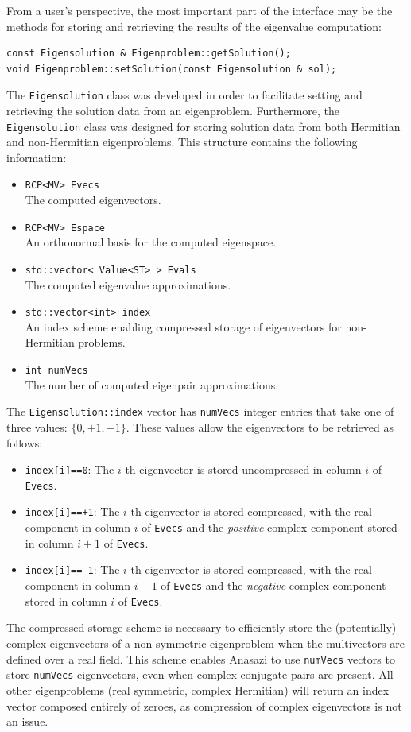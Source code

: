 \documentclass[acmtoms]{acmtrans2m}
\newcommand{\aspace}[1]{\texttt{#1}}
\begin{document}
From a user's perspective, the most important part of the interface may be the methods 
for storing and retrieving the results of the eigenvalue computation:
\begin{verbatim}
const Eigensolution & Eigenproblem::getSolution();
void Eigenproblem::setSolution(const Eigensolution & sol);
\end{verbatim}
The \aspace{Eigensolution} class was developed in order to
facilitate setting and retrieving the solution data from an eigenproblem.  
Furthermore, the \aspace{Eigensolution} class was designed for storing
solution data from both Hermitian and non-Hermitian eigenproblems. 
This structure contains the following information:
\begin{itemize}
  \item \verb!RCP<MV> Evecs! \\
   The computed eigenvectors.
 \item \verb!RCP<MV> Espace! \\
   An orthonormal basis for the computed eigenspace.
 \item \verb!std::vector< Value<ST> > Evals! \\
   The computed eigenvalue approximations.
 \item \verb!std::vector<int> index! \\
   An index scheme enabling compressed storage of eigenvectors for non-Hermitian problems.
 \item \verb!int numVecs! \\
   The number of computed eigenpair approximations.
\end{itemize}
The \aspace{Eigensolution::index} vector has \aspace{numVecs} integer entries that take 
one of three values: $\{0, +1, -1\}$. These values allow the eigenvectors to be retrieved as follows:
\begin{itemize}
  \item \aspace{index[i]==0}: The $i$-th eigenvector is stored uncompressed in column $i$ of
    \verb!Evecs!.
  \item \aspace{index[i]==+1}: The $i$-th eigenvector is stored compressed, with the real
    component in column $i$ of \verb!Evecs! and the \emph{positive} complex component
    stored in column $i+1$ of \verb!Evecs!.
  \item \aspace{index[i]==-1}: The $i$-th eigenvector is stored compressed, with the real
    component in column $i-1$ of \verb!Evecs! and the \emph{negative} complex component
    stored in column $i$ of \verb!Evecs!.
\end{itemize}
The compressed storage scheme is necessary to efficiently store the (potentially) complex
eigenvectors of a non-symmetric eigenproblem when the multivectors are defined over a real
field. This scheme enables Anasazi to use \aspace{numVecs} vectors to store
\aspace{numVecs} eigenvectors, even when complex conjugate pairs are present. All other
eigenproblems (real symmetric, complex Hermitian) will return an index vector composed
entirely of zeroes, as compression of complex eigenvectors is not an issue.
\end{document}

